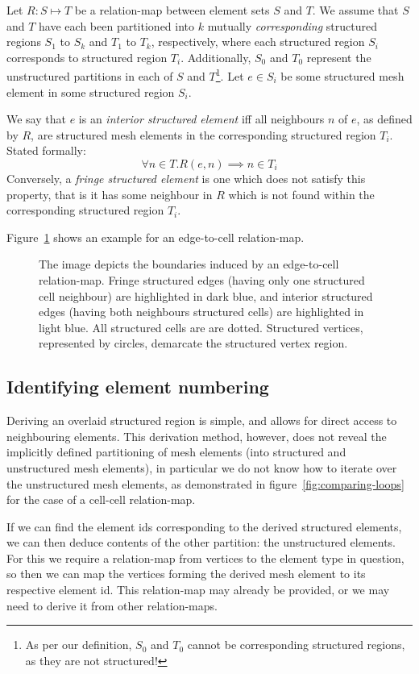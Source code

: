 Let $R: S \mapsto T$ be a relation-map between element sets $S$ and $T$. We assume that $S$ and $T$ have each been partitioned into $k$ mutually \emph{corresponding} structured regions $S_1$ to $S_k$ and $T_1$ to $T_k$, respectively, where each structured region $S_i$ corresponds to structured region $T_i$. Additionally, $S_0$ and $T_0$ represent the unstructured partitions in each of $S$ and $T$\footnote{As per our definition, $S_0$ and $T_0$ cannot be corresponding structured regions, as they are not structured!}.
Let $e \in S_i$ be some structured mesh element in some structured region $S_i$.

We say that $e$ is an \emph{interior structured element} iff all neighbours $n$ of $e$, as defined by $R$, are structured mesh elements in the corresponding structured region $T_i$. Stated formally:
$$\forall n \in T. R(e,n) \implies n \in T_i$$
Conversely, a \emph{fringe structured element} is one which does not satisfy this property, that is it has some neighbour in $R$ which is not found within the corresponding structured region $T_i$.

Figure~\ref{fig:fringe-edges} shows an example for an edge-to-cell relation-map.

\begin{figure}

\caption{The image depicts the boundaries induced by an edge-to-cell relation-map. Fringe structured edges (having only one structured cell neighbour) are highlighted in dark blue, and interior structured edges (having both neighbours structured cells) are highlighted in light blue. All structured cells are are dotted. Structured vertices, represented by circles, demarcate the structured vertex region.}
\label{fig:fringe-edges}
\end{figure}


\subsection{Identifying element numbering}
Deriving an overlaid structured region is simple, and allows for direct access to neighbouring elements. This derivation method, however, does not reveal the implicitly defined partitioning of mesh elements (into structured and unstructured mesh elements), in particular we do not know how to iterate over the unstructured mesh elements, as demonstrated in figure~\ref{fig:comparing-loops} for the case of a cell-cell relation-map.

If we can find the element ids corresponding to the derived structured elements, we can then deduce contents of the other partition: the unstructured elements. For this we require a relation-map from vertices to the element type in question, so then we can map the vertices forming the derived mesh element to its respective element id. This relation-map may already be provided, or we may need to derive it from other relation-maps.

